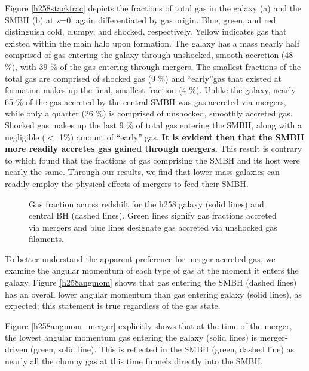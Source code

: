 \documentclass[12pt,headA,chapB]{fiskthesis}
\begin{document}
Figure \ref{h258stackfrac} depicts the fractions of total gas in the galaxy (a) and the SMBH (b) at z=0, again differentiated by gas origin. Blue, green, and red distinguish cold, clumpy, and shocked, respectively. Yellow indicates gas that existed within the main halo upon formation. The galaxy has a mass nearly half comprised of gas entering the galaxy through unshocked, smooth accretion (48 \%), with 39 \% of the gas entering through mergers. The smallest fractions of the total gas are comprised of shocked gas (9 \%) and ``early''gas that existed at formation makes up the final, smallest fraction (4 \%). Unlike the galaxy, nearly 65 \% of the gas accreted by the central SMBH was gas accreted via mergers, while only a quarter (26 \%) is comprised of unshocked, smoothly accreted gas. Shocked gas makes up the last 9 \% of total gas entering the SMBH, along with a negligible ($<$ 1\%) amount of ``early'' gas. \textbf{It is evident then that the SMBH more readily accretes gas gained through mergers.} This result is contrary to \cite{Bellovary2013} which found that the fractions of gas comprising the SMBH and its host were nearly the same. Through our results, we find that lower mass galaxies can readily employ the physical effects of mergers to feed their SMBH.

\begin{figure}[h]
\centerline{}
\caption[GASOLINE h258 Galaxy and SMBH Gas Fractions Across Time]{Gas fraction across redshift for the h258 galaxy (solid lines) and central BH (dashed lines). Green lines signify gas fractions accreted via mergers and blue lines designate gas accreted via unshocked gas filaments.}
\label{h258numfrac} 
\end{figure}

To better understand the apparent preference for merger-accreted gas, we examine the angular momentum of each type of gas at the moment it enters the galaxy. Figure \ref{h258angmom} shows that gas entering the SMBH (dashed lines) has an overall lower angular momentum than gas entering galaxy (solid lines), as expected; this statement is true regardless of the gas state. 

Figure \ref{h258angmom_merger} explicitly shows that at the time of the merger, the lowest angular momentum gas entering the galaxy (solid lines) is merger-driven (green, solid line). This is reflected in the SMBH (green, dashed line) as nearly all the clumpy gas at this time funnels directly into the SMBH.
\end{document}
